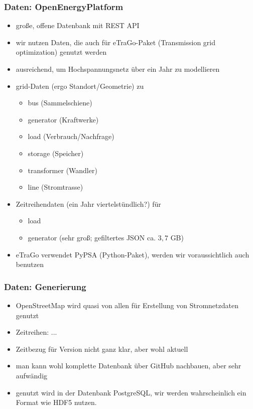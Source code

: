 \documentclass[aspectratio=169,t]{beamer}
\begin{document}
	\begin{frame}
		\frametitle{Daten: Open­Energy­Platform}
		\begin{itemize}
			\item große, offene Datenbank mit REST API
			\item wir nutzen Daten, die auch für eTraGo-Paket (Transmission grid optimization) genutzt werden
			\item ausreichend, um Hochspannungsnetz über ein Jahr zu modellieren
			\item grid-Daten (ergo Standort/Geometrie) zu
			\begin{itemize}
				\item bus (Sammelschiene)
				\item generator (Kraftwerke)
				\item load (Verbrauch/Nachfrage)
				\item storage (Speicher)
				\item transformer (Wandler)
				\item line (Stromtrasse)
			\end{itemize}
			\item Zeitreihendaten (ein Jahr viertelstündlich?) für
			\begin{itemize}
				\item load 
				\item generator (sehr groß; gefiltertes JSON ca. $3{,}7$ GB)
			\end{itemize}
			\item eTraGo verwendet PyPSA (Python-Paket), werden wir voraussichtlich auch benutzen
		\end{itemize}
	\end{frame}
	
	\begin{frame}
		\frametitle{Daten: Generierung}
		\begin{itemize}
			\item OpenStreetMap wird quasi von allen für Erstellung von Stromnetzdaten genutzt
			\item Zeitreihen: ...
			\item Zeitbezug für Version nicht ganz klar, aber wohl aktuell
			\item man kann wohl komplette Datenbank über GitHub nachbauen, aber sehr aufwändig
			\item genutzt wird in der Datenbank PostgreSQL, wir werden wahrscheinlich ein Format wie HDF5 nutzen.
		\end{itemize}
	\end{frame}
\end{document}
